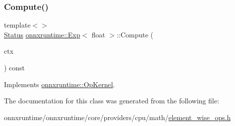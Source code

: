 \subsubsection{\texorpdfstring{Compute()}{Compute()}\hspace{0.1cm}{\footnotesize\ttfamily [2/2]}}
{\footnotesize\ttfamily template$<$$>$ \\
\mbox{\hyperlink{classonnxruntime_1_1common_1_1Status}{Status}} \mbox{\hyperlink{classonnxruntime_1_1Exp}{onnxruntime\+::\+Exp}}$<$ float $>$\+::Compute (\begin{DoxyParamCaption}\item[{\mbox{\hyperlink{classonnxruntime_1_1OpKernelContext}{Op\+Kernel\+Context}} $\ast$}]{ctx }\end{DoxyParamCaption}) const\hspace{0.3cm}{\ttfamily [virtual]}}



Implements \mbox{\hyperlink{classonnxruntime_1_1OpKernel_a9eca8656a78b1b3ab9d3351a12798650}{onnxruntime\+::\+Op\+Kernel}}.



The documentation for this class was generated from the following file\+:\begin{DoxyCompactItemize}
\item 
onnxruntime/onnxruntime/core/providers/cpu/math/\mbox{\hyperlink{element__wise__ops_8h}{element\+\_\+wise\+\_\+ops.\+h}}\end{DoxyCompactItemize}
